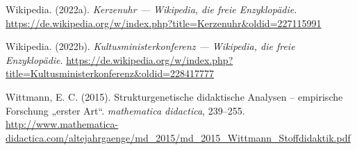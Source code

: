 \documentclass[
]{scrbook}
\newlength{\cslhangindent}
\newenvironment{CSLReferences}[2] %
 {\begin{list}{}{%
  \setlength{\itemindent}{0pt}
  \setlength{\leftmargin}{0pt}
  \setlength{\parsep}{0pt}
  \ifodd #1
   \setlength{\leftmargin}{\cslhangindent}
   \setlength{\itemindent}{-1\cslhangindent}
  \fi
  \setlength{\itemsep}{#2\baselineskip}}}
 {\end{list}}
\theoremstyle{definition}
\theoremstyle{definition}
\theoremstyle{definition}
\theoremstyle{definition}
\theoremstyle{remark}
\begin{document}
\begin{CSLReferences}{1}{0}
Wikipedia. (2022a). \emph{Kerzenuhr --- Wikipedia{,} die freie Enzyklopädie}. \url{https://de.wikipedia.org/w/index.php?title=Kerzenuhr&oldid=227115991}

Wikipedia. (2022b). \emph{Kultusministerkonferenz --- Wikipedia{,} die freie Enzyklopädie}. \url{https://de.wikipedia.org/w/index.php?title=Kultusministerkonferenz&oldid=228417777}

Wittmann, E. C. (2015). Strukturgenetische didaktische {Analysen} -- empirische {Forschung} „erster {Art}``. \emph{mathematica didactica}, 239--255. \url{http://www.mathematica-didactica.com/altejahrgaenge/md_2015/md_2015_Wittmann_Stoffdidaktik.pdf}

\end{CSLReferences}

\end{document}
